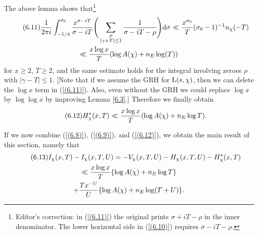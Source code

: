 \documentclass[./main]{subfiles}
\begin{document}
The above lemma shows that\footnote{Editor's correction: in (\ref{(6.11)}) the original prints $\sigma+iT-\rho$ in the inner denominator. The lower horizontal side in (\ref{(6.10)}) requires $\sigma-iT-\rho$.}
\begin{multline}\tag{6.11}\label{(6.11)} \frac{1}{2\pi i} \int_{-1/4}^{\sigma_0} \frac{x^{\sigma - iT}}{\sigma - iT} \Bigg(\sum_{\substack{\rho \\ |\gamma + T| \leq 1}} \frac{1}{\sigma - iT - \rho}\Bigg) \mathrm{d}{\sigma} \ll \frac{x^{\sigma_0}}{T}(\sigma_0 - 1)^{-1} n_{\chi}(-T) \\ \ll \frac{x \log x}{T}(\log A(\chi) + n_E \log(T))
\end{multline}
for $x \geq 2$, $T \geq 2$, and the same estimate holds for the integral involving zeroes $\rho$ with $|\gamma - T| \leq 1$. [Note that if we assume the GRH for $\operatorname{L}(s, \chi)$, then we can delete the $\log x$ term in (\ref{(6.11)}). Also, even without the GRH we could replace $\log x$ by $\log \log x$  by improving Lemma \ref{6.3}.] Therefore we finally obtain 
\[\tag{6.12}\label{(6.12)} H_{\chi}^{*}(x,T) \ll \frac{x \log x}{T}(\log A(\chi) + n_E \log T).
\]

If we now combine (\ref{(6.8)}), (\ref{(6.9)}), and (\ref{(6.12)}), we obtain the main result of this section, namely that 
\begin{multline}\tag{6.13}\label{(6.13)}
    I_{\chi}(x,T) - I_{\chi}(x,T,U) = -V_{\chi}(x,T,U) - H_{\chi}(x,T,U) - H_{\chi}^{*}(x,T)\\ \ll \frac{x\log x}{T}\{\log A(\chi) + n_E \log T\}\\ + \frac{Tx^{-U}}{U} \{\log A(\chi) + n_E \log(T+U)\}.
\end{multline}
\end{document}
